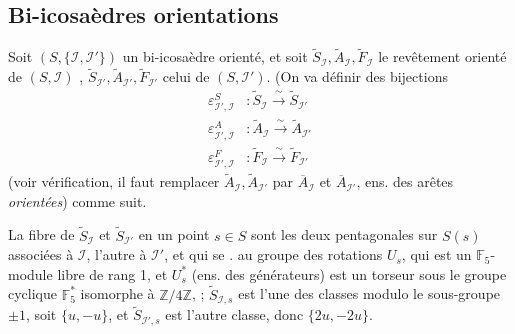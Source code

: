 \documentclass[11pt,a4paper]{article}
\begin{document}
\subsection{Bi-icosaèdres  orientations}

Soit $(S,\{\mathcal I,\mathcal I'\})$ un bi-icosaèdre  orienté, et soit $\widetilde S_{\mathcal I}, \widetilde A_{\mathcal I}, \widetilde F_{\mathcal I}$ le revêtement  orienté de $(S,\mathcal I)$ , $\widetilde S_{\mathcal I'}, \widetilde A_{\mathcal I'}, \widetilde F_{\mathcal I'}$ celui de $(S,\mathcal I')$. (On va définir des bijections
\[
\begin{aligned}
\varepsilon^S_{\mathcal I',\mathcal I} &: \widetilde S_{\mathcal I} \xrightarrow{\ \sim\ } \widetilde S_{\mathcal I'}\\
\varepsilon^A_{\mathcal I',\mathcal I} &: \widetilde A_{\mathcal I} \xrightarrow{\ \sim\ } \widetilde A_{\mathcal I'}\\
\varepsilon^F_{\mathcal I',\mathcal I} &: \widetilde F_{\mathcal I} \xrightarrow{\ \sim\ } \widetilde F_{\mathcal I'}
\end{aligned}
\]
(voir vérification, il faut \struck{\ill{}} remplacer $\widetilde A_{\mathcal I}, \widetilde A_{\mathcal I'}$ par $\overline A_{\mathcal I}$ et $\overline A_{\mathcal I'}$, ens. des arêtes \emph{orientées}) comme suit.

\struck{\ill{}} La fibre de $\widetilde S_{\mathcal I}$ et $\widetilde S_{\mathcal I'}$ en un point $s\in S$ sont les  deux  pentagonales sur $S(s)$ associées  à $\mathcal I$, l'autre à $\mathcal I'$, et qui se . \struck{\ill{}}  au groupe des rotations $U_s$,  qui est un  $\mathbb F_5$-module libre de rang 1, et $U_s^*$ (ens. des générateurs) est un torseur sous \struck{\ill{}} le groupe cyclique $\mathbb F_5^*$ isomorphe à $\mathbb Z/4\mathbb Z$, \struck{\ill{}} ; $\widetilde S_{\mathcal I,s}$ est l'une des classes modulo le sous-groupe $\pm1$, soit $\{u,-u\}$, et $\widetilde S_{\mathcal I',s}$ est l'autre classe, donc $\{2u,-2u\}$.
\end{document}
